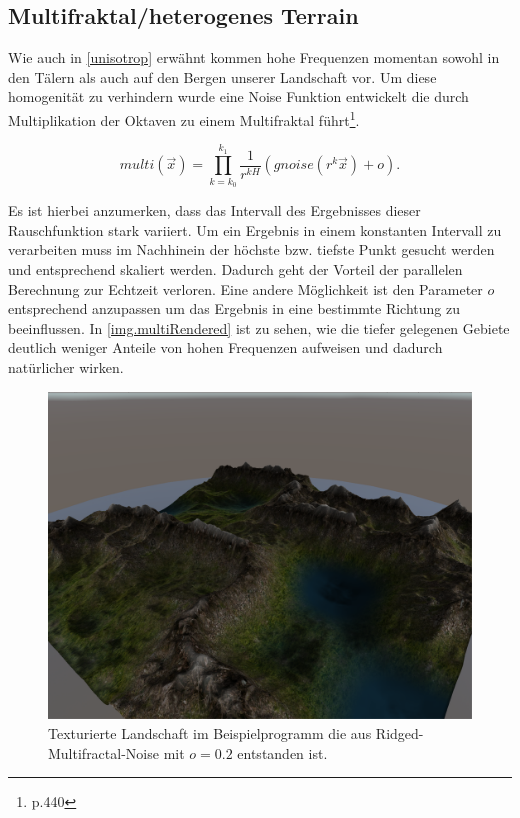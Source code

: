 \subsection{Multifraktal/heterogenes Terrain}
Wie auch in \ref{unisotrop} erwähnt kommen hohe Frequenzen momentan sowohl in den Tälern als auch auf den Bergen unserer Landschaft vor. Um diese homogenität zu verhindern wurde eine Noise Funktion entwickelt die durch Multiplikation der Oktaven zu einem Multifraktal führt\footnote{\cite{texturingAndModeling} p.440}. 

\begin{equation} \label{eq.multiNoise}
multi(\vec{x}) = \prod_{k=k_0}^{k_1}\frac{1}{r^{kH}}(gnoise(r^k\vec{x})+o).
\end{equation}

Es ist hierbei anzumerken, dass das Intervall des Ergebnisses dieser Rauschfunktion stark variiert. Um ein Ergebnis in einem konstanten Intervall zu verarbeiten muss im Nachhinein der höchste bzw. tiefste Punkt gesucht werden und entsprechend skaliert werden. Dadurch geht der Vorteil der parallelen Berechnung zur Echtzeit verloren. Eine andere Möglichkeit ist den Parameter $o$ entsprechend anzupassen um das Ergebnis in eine bestimmte Richtung zu beeinflussen. 
In \autoref{img.multiRendered} ist zu sehen, wie die tiefer gelegenen Gebiete deutlich weniger Anteile von hohen Frequenzen aufweisen und dadurch natürlicher wirken.



\begin{figure}[!hp]
\centering
\includegraphics[width=\textwidth]{images/ridgedmulti_rendered.png}
\caption{Texturierte Landschaft im Beispielprogramm die aus Ridged-Multifractal-Noise mit $o=0.2$ entstanden ist.}\label{img.multiRendered}
\end{figure}

